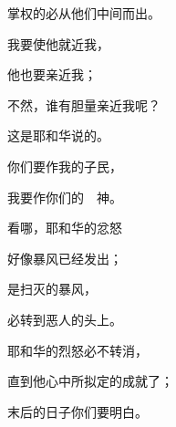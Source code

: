{\par }{\Q 掌权的必从他们中间而出。
\par }{\Q 我要使他就近我，
\par }{\Q 他也要亲近我；
\par }{\Q 不然，谁有胆量亲近我呢？
\par }{\Q 这是耶和华说的。
\par }{\Q {}你们要作我的子民，
\par }{\Q 我要作你们的　神。
\par }{\BB \par }{\Q {}看哪，耶和华的忿怒
\par }{\Q 好像暴风已经发出；
\par }{\Q 是扫灭的暴风，
\par }{\Q 必转到恶人的头上。
\par }{\Q {}耶和华的烈怒必不转消，
\par }{\Q 直到他心中所拟定的成就了；
\par }{\Q 末后的日子你们要明白。

}
